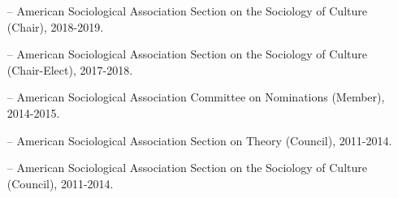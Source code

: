 \begin{itemize}[itemsep=-0.5ex]
    \item[--] American Sociological Association Section on the Sociology of Culture (Chair), 2018-2019.
    
    \item[--] American Sociological Association Section on the Sociology of Culture (Chair-Elect), 2017-2018.
    
    \item[--] American Sociological Association Committee on Nominations (Member), 2014-2015. 
    
    \item[--] American Sociological Association Section on Theory (Council), 2011-2014.
    
    \item[--] American Sociological Association Section on the Sociology of Culture (Council), 2011-2014.
\end{itemize}
